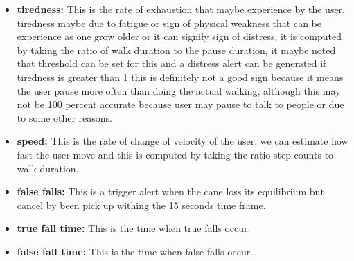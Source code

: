 \documentclass[a4paper, parskip=full]{scrartcl}
\begin{document}
\begin{itemize}
\item \textbf{tiredness:} This is the rate of exhaustion that maybe experience by the user, tiredness maybe due to fatigue or sign of physical weakness that can be experience as one grow older or it can signify sign of distress, it is computed by taking the ratio of walk duration to the pause duration, it maybe noted that threshold can be set for this and a distress alert can be generated if tiredness is greater than 1 this is definitely not a good sign because it means the user pause more often than doing the actual walking, although this may not be 100 percent accurate because user may pause to talk to people or due to some other reasons.

\item \textbf{speed:} This is the rate of change of velocity of the user, we can estimate how fast the user move and this is computed by taking the ratio step counts to walk duration.

\item \textbf{false falls:} This is a trigger alert when the cane loss its equilibrium but cancel by been pick up withing the 15 seconds time frame.

\item \textbf{true fall time:} This is the time when true falls occur.

\item \textbf{false fall time:} This is the time when false falls occur.
	
\end{itemize}



 
\end{document}
